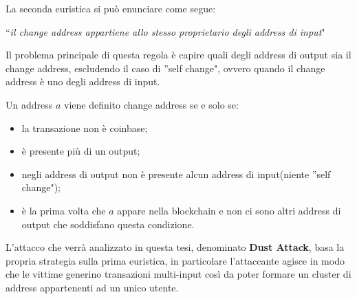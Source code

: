 La seconda euristica si può enunciare come segue: 
\begin{center}
    ``\textit{il change address appartiene allo stesso proprietario degli address di input}"
\end{center}

Il problema principale di questa regola è capire quali degli address di output sia il change address, escludendo il caso di ''self change", ovvero quando il change address è uno degli address di input. 

Un address $a$ viene definito change address se e solo se:
\begin{itemize}
    \item la transazione non è coinbase;
    \item è presente più di un output;
    \item negli address di output non è presente alcun address di input(niente ''self change");
    \item è la prima volta che $a$ appare nella blockchain e non ci sono altri address di output che soddisfano questa condizione.
\end{itemize}

L'attacco che verrà analizzato in questa tesi, denominato \textbf{Dust Attack}, basa la propria strategia sulla prima euristica, in particolare l'attaccante agisce in modo che le vittime generino transazioni multi-input così da poter formare un cluster di address appartenenti ad un unico utente.







